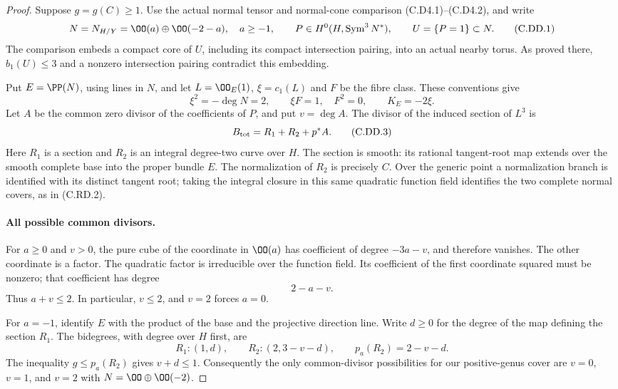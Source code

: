 \begin{proof}
Suppose $g=g(C)\ge1$. Use the actual normal tensor and
normal-cone comparison (C.D4.1)--(C.D4.2), and write
\[
 N=N_{H/Y}=\OO(a)\oplus\OO(-2-a),\quad a\ge-1,
 \qquad P\in H^0(H,\operatorname{Sym}^3N^*),
 \qquad U=\{P=1\}\subset N.
\tag{C.DD.1}\label{cdp:eq:C.DD.1}
\]
The comparison embeds a compact core of $U$, including
its compact intersection pairing, into an actual nearby
torus. As proved there, $b_1(U)\le3$ and a nonzero
intersection pairing contradict this embedding.

Put $E=\PP(N)$, using lines in $N$, and let
$L=\OO_E(1)$, $\xi=c_1(L)$ and $F$ be the fibre class.
These conventions give
\[
 \xi^2=-\deg N=2,\qquad \xi F=1,\quad F^2=0,
 \qquad K_E=-2\xi.
\tag{C.DD.2}\label{cdp:eq:C.DD.2}
\]
Let $A$ be the common zero divisor of the coefficients
of $P$, and put $v=\deg A$. The divisor of the induced
section of $L^3$ is
\[
                    B_{\rm tot}=R_1+R_2+p^*A.
\tag{C.DD.3}\label{cdp:eq:C.DD.3}
\]
Here $R_1$ is a section and $R_2$ is an integral
degree-two curve over $H$. The section is smooth:
its rational tangent-root map extends over the smooth
complete base into the proper bundle $E$.
The normalization of $R_2$ is precisely $C$. Over the
generic point a normalization branch is identified
with its distinct tangent root; taking the integral
closure in this same quadratic function field identifies
the two complete normal covers, as in (C.RD.2).

\paragraph{All possible common divisors.}
For $a\ge0$ and $v>0$, the pure cube of the coordinate
in $\OO(a)$ has coefficient of degree $-3a-v$, and
therefore vanishes. The other coordinate is a factor.
The quadratic factor is irreducible over the function
field. Its coefficient of the first coordinate squared
must be nonzero; that coefficient has degree
\[
                              2-a-v.
\tag{C.DD.4}\label{cdp:eq:C.DD.4}
\]
Thus $a+v\le2$. In particular, $v\le2$, and $v=2$
forces $a=0$.

For $a=-1$, identify $E$ with the product of the base
and the projective direction line. Write $d\ge0$ for
the degree of the map defining the section $R_1$.
The bidegrees, with degree over $H$ first, are
\[
 R_1:(1,d),\qquad R_2:(2,3-v-d),\qquad
 p_a(R_2)=2-v-d.
\tag{C.DD.5}\label{cdp:eq:C.DD.5}
\]
The inequality $g\le p_a(R_2)$ gives $v+d\le1$.
Consequently the only common-divisor possibilities
for our positive-genus cover are $v=0$, $v=1$, and
$v=2$ with $N=\OO\oplus\OO(-2)$.


\end{proof}
